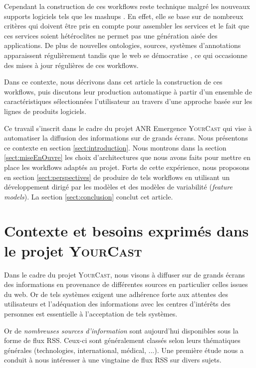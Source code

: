 \documentclass[]{easychair}
\newcommand{\Y}[0]{\textsc{YourCast}\xspace}
\begin{document}
Cependant la construction de ces workflows reste technique malgré les nouveaux supports logiciels tels que les mashups \cite{Floyd2007} \cite{Milanovic2004}. En effet, elle se base sur de nombreux critères qui doivent être pris en compte pour assembler les services et le fait que ces services soient hétéroclites ne permet pas une génération aisée des applications. 
De plus de nouvelles ontologies, sources, systèmes d'annotations apparaissent régulièrement tandis que le web se démocratise \cite{Anderruthy2007} \cite{Bross2010}, ce qui occasionne des mises à jour régulières de ces workflows.

Dans ce contexte, nous décrivons dans cet article la construction de ces workflows, puis discutons leur production automatique  à partir d'un ensemble de caractéristiques sélectionnées l'utilisateur au travers d'une approche basée sur les lignes de produits logiciels. 

Ce travail s'inscrit dans le cadre du projet ANR Emergence \Y qui vise à automatiser la diffusion des informations sur de grands écrans. Nous présentons ce contexte en section \ref{sect:introduction}.
Nous montrons dans la section \ref{sect:miseEnOuvre} les choix d'architectures  que nous avons faits pour mettre en place les workflows adaptés au projet. Forts de cette expérience, nous proposons en section \ref{sect:perspectives} de produire de tels workflows en utilisant un développement dirigé par les modèles et des modèles de variabilité (\textit{feature models})\cite{Report1990}.  La section \ref{sect:conclusion} conclut cet article. 



\section{Contexte et besoins exprimés dans le projet \Y}
\label{sect:exemple}
Dans le cadre du projet \Y, nous visons à diffuser sur de grands écrans des informations en provenance de différentes sources en particulier celles issues du web. Or de tels systèmes exigent une adhérence forte aux attentes des utilisateurs et l'adéquation des informations avec les centres d'intérêts des personnes est essentielle à l'acceptation de tels systèmes. 

Or de \textit{nombreuses sources d'information} sont aujourd'hui disponibles sous la forme de flux RSS. Ceux-ci sont généralement classés selon leurs thématiques générales (technologies, international, médical, ...). Une première étude nous a conduit à nous intéresser à une vingtaine de flux RSS sur divers sujets. 
\end{document}
